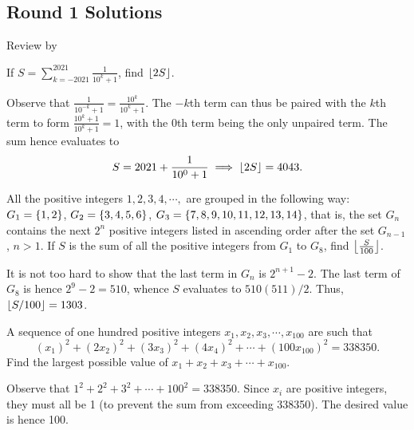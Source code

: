 \subsection{Round 1 Solutions}\label{S::2022-O-1}

\begin{resources}
    Review by 
\end{resources}

\begin{question}[4043]\label{A::2022-O-1-1}
    If $S = \displaystyle\sum_{k = -2021}^{2021} \frac{1}{10^k + 1}$, find $\left\lfloor 2S \right\rfloor$.
\end{question}
\begin{solution*}
    Observe that $\frac{1}{10^{-k} + 1} = \frac{10^k}{10^{k} + 1}$. The $-k$th term can thus be paired with the $k$th term to form $\frac{10^k + 1}{10^k + 1} = 1$, with the $0$th term being the only unpaired term. The sum hence evaluates to \[S = 2021 + \frac{1}{10^0 + 1} \implies \left\lfloor 2S \right\rfloor = 4043.\]
\end{solution*}

\begin{question}[1303]\label{A::2022-O-1-2}
    All the positive integers $1, 2, 3, 4, \cdots,$ are grouped in the following way: $G_1 = \left\lbrace 1, 2 \right\rbrace$, $G_2 = \left\lbrace 3, 4, 5, 6 \right\rbrace$, $G_3 = \left\lbrace 7, 8, 9, 10, 11, 12, 13, 14 \right\rbrace$, that is, the set $G_n$ contains the next $2^n$ positive integers listed in ascending order after the set $G_{n-1}$, $n > 1$. If $S$ is the sum of all the positive integers from $G_1$ to $G_8$, find $\left\lfloor \frac{S}{100} \right\rfloor$.
\end{question}
\begin{solution*}
    It is not too hard to show that the last term in $G_n$ is $2^{n+1} - 2$. The last term of $G_8$ is hence $2^9 - 2 = 510$, whence $S$ evaluates to $510(511)/2$. Thus, $\left\lfloor S/100 \right\rfloor = 1303$.
\end{solution*}

\begin{question}[100]\label{A::2022-O-1-3}
    A sequence of one hundred positive integers $x_1, x_2, x_3, \cdots, x_{100}$ are such that \[(x_1)^2 + (2x_2)^2 + (3x_3)^2 + (4x_4)^2 + \cdots + (100x_{100})^2 = 338350.\] Find the largest possible value of $x_1 + x_2 + x_3 + \cdots + x_{100}$.
\end{question}
\begin{solution*}
    Observe that $1^2 + 2^2 + 3^2 + \cdots + 100^2 = 338350$. Since $x_i$ are positive integers, they must all be 1 (to prevent the sum from exceeding 338350). The desired value is hence 100.
\end{solution*}


